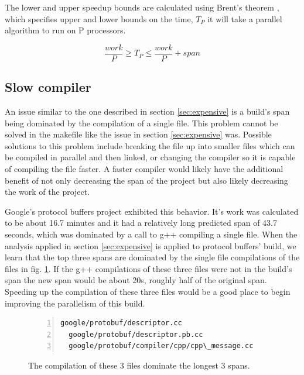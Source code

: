 \documentclass[sigconf,10pt,authorversion]{acmart}\settopmatter{printfolios=true,printccs=false,printacmref=false}
\begin{document}
The lower and upper speedup bounds are calculated using Brent's theorem \cite{brents}, which
specifies upper and lower bounds on the time, $T_P$ it will take a parallel algorithm to run on P
processors.

\begin{equation*}
  \frac{work}{P} \geq T_P \leq \frac{work}{P} + span 
\end{equation*}






\subsection{Slow compiler}
\label{sec:compiler}

An issue similar to the one described in section \ref{sec:expensive} is a build's
span being dominated by the compilation of a single file.  This problem cannot be
solved in the makefile like the issue in section \ref{sec:expensive} was.
Possible solutions to this problem include
breaking the file up into smaller files which can be compiled in parallel and then
linked, or changing the compiler so it is capable of compiling the file faster.
A faster compiler would likely have the additional benefit of not only decreasing the span
of the project but also likely decreasing the work of the project.

Google's protocol buffers project \cite{protobufs3.6.1} exhibited this behavior.  It's work was calculated
to be about 16.7 minutes and it had a relatively
long predicted span of 43.7 seconds, which was dominated by a call to g++ compiling
a single file.  When the analysis applied in section \ref{sec:expensive} is applied
to protocol buffers' build, we learn that the top three spans are dominated by the
single file compilations of the files in fig. \ref{code:g++1}.  If the g++ compilations
of these three files were not in the build's span the new span would be about 20s,
roughly half of the original span.  Speeding up the compilation of these three files
would be a good place to begin improving the parallelism of this build.

\begin{figure}[H]
\begin{Verbatim}[commandchars=\\\{\},codes={\catcode`$=3\catcode`^=7\catcode`_=8},fontsize=\small,numbers=left,xleftmargin=5mm]
  google/protobuf/descriptor.cc
  google/protobuf/descriptor.pb.cc
  google/protobuf/compiler/cpp/cpp\_message.cc
\end{Verbatim}
\caption{The compilation of these 3 files dominate the longest 3 spans.}
\label{code:g++1}
\end{figure}
\end{document}
